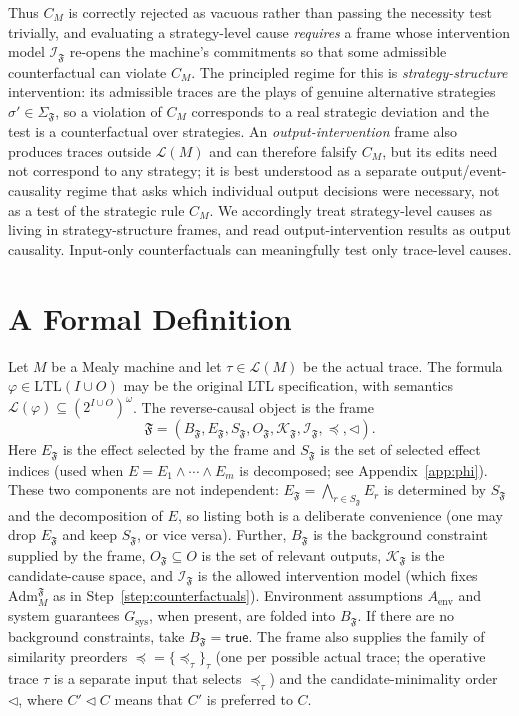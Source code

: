 \documentclass[11pt]{article}
\theoremstyle{remark}
\newcommand{\LTL}{\mathrm{LTL}}
\newcommand{\Lang}{\mathcal{L}}
\newcommand{\True}{\mathsf{true}}
\newcommand{\Frame}{\mathfrak{F}}
\newcommand{\Adm}{\mathrm{Adm}}
\begin{document}
Thus \(C_M\) is correctly rejected as vacuous rather than passing the necessity
test trivially, and evaluating a strategy-level cause \emph{requires} a frame
whose intervention model \(\mathcal{I}_{\Frame}\) re-opens the machine's
commitments so that some admissible counterfactual can violate \(C_M\). The
principled regime for this is \emph{strategy-structure} intervention: its
admissible traces are the plays of genuine alternative strategies
\(\sigma'\in\Sigma_{\Frame}\), so a violation of \(C_M\) corresponds to a real
strategic deviation and the test is a counterfactual over strategies. An
\emph{output-intervention} frame also produces traces outside \(\Lang(M)\) and
can therefore falsify \(C_M\), but its edits need not correspond to any
strategy; it is best understood as a separate output/event-causality regime that
asks which individual output decisions were necessary, not as a test of the
strategic rule \(C_M\). We accordingly treat strategy-level causes as living in
strategy-structure frames, and read output-intervention results as output
causality. Input-only counterfactuals can meaningfully test only trace-level
causes.

\section{A Formal Definition}
\label{sec:formal}

Let \(M\) be a Mealy machine and let \(\tau\in\Lang(M)\) be the actual trace.
The formula \(\varphi\in\LTL(I\cup O)\) may be the original LTL specification,
with semantics \(\Lang(\varphi)\subseteq(2^{I\cup O})^\omega\). The
reverse-causal object is the frame
\[
  \Frame
  =
  (B_{\Frame},
   E_{\Frame},
   S_{\Frame},
   O_{\Frame},
   \mathcal{K}_{\Frame},
   \mathcal{I}_{\Frame},
   {\preceq},
   \triangleleft).
\]
Here \(E_{\Frame}\) is the effect selected by the frame and \(S_{\Frame}\) is the
set of selected effect indices (used when \(E=E_1\land\cdots\land E_m\) is
decomposed; see Appendix~\ref{app:phi}). These two components are not
independent: \(E_{\Frame}=\bigwedge_{r\in S_{\Frame}}E_r\) is determined by
\(S_{\Frame}\) and the decomposition of \(E\), so listing both is a deliberate
convenience (one may drop \(E_{\Frame}\) and keep \(S_{\Frame}\), or vice versa).
Further, \(B_{\Frame}\) is the background constraint supplied by the frame,
\(O_{\Frame}\subseteq O\) is the set of relevant outputs,
\(\mathcal{K}_{\Frame}\) is the candidate-cause space, and
\(\mathcal{I}_{\Frame}\) is the allowed intervention model (which fixes
\(\Adm_M^{\Frame}\) as in Step~\ref{step:counterfactuals}). Environment assumptions \(A_{\mathrm{env}}\)
and system guarantees \(G_{\mathrm{sys}}\), when present, are folded into
\(B_{\Frame}\). If there are no background constraints, take
\(B_{\Frame}=\True\). The frame also supplies the family of similarity
preorders \({\preceq}=\{\preceq_\tau\}_\tau\) (one per possible actual trace; the
operative trace \(\tau\) is a separate input that selects \(\preceq_\tau\)) and
the candidate-minimality order \(\triangleleft\), where \(C'\triangleleft C\)
means that \(C'\) is preferred to \(C\).
\end{document}
